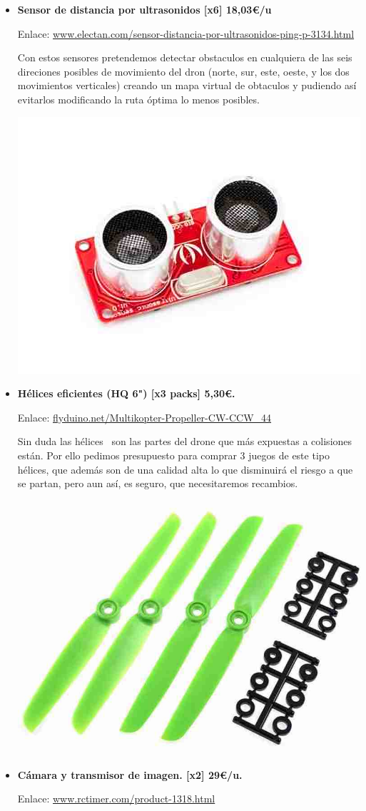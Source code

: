 \documentclass[12pt,twoside]{report}
\begin{document}
\begin{itemize}
\item  {\bf Sensor de distancia por ultrasonidos [x6] 18,03\euro{}/u}

Enlace: \url{www.electan.com/sensor-distancia-por-ultrasonidos-ping-p-3134.html}

Con estos sensores pretendemos detectar obstaculos en cualquiera de las seis direciones posibles de movimiento del dron (norte, sur, este, oeste, y los dos movimientos verticales) creando un mapa virtual de obtaculos y pudiendo así evitarlos modificando la ruta óptima lo menos posibles.

\centerline{
    \includegraphics[width=0.45\linewidth]{fotos/sensor_ultra.jpg}}

\item {\bf Hélices eficientes (HQ 6") [x3 packs] 5,30\euro{}.}

Enlace: \url{flyduino.net/Multikopter-Propeller-CW-CCW_44}

Sin duda las hélices  son las partes del drone que más expuestas a colisiones están. Por ello pedimos presupuesto para comprar 3 juegos de este tipo hélices, que además son de una calidad alta lo que disminuirá el riesgo a que se partan, pero aun así, es seguro, que necesitaremos recambios.

\centerline{
    \includegraphics[width=0.45\linewidth]{fotos/helices.jpg}}

\item {\bf Cámara y transmisor de imagen. [x2] 29\euro{}/u.}

Enlace: \url{www.rctimer.com/product-1318.html}


\end{itemize}
\end{document}
